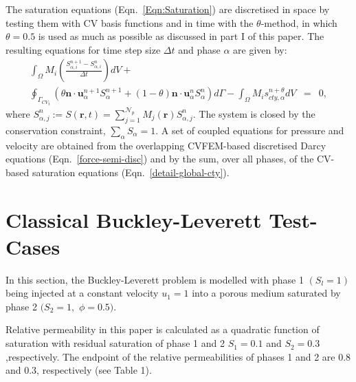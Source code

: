 \documentclass[preprint,authoryear,12pt]{elsarticle}
\begin{document}
The saturation equations (Eqn.~\ref{Eqn:Saturation}) are discretised
in space by testing them with CV basis functions and in
time with the $\theta$-method, in which $\theta=0.5$ is used as much
as possible as discussed in part I of this paper. The resulting
equations for time step size $\Delta t$ and phase $\alpha$ are given
by:
\begin{eqnarray}
  \displaystyle \int_{\Omega} M_{i}
  \left(\frac{S_{\alpha,i}^{n+1}-S_{\alpha,i}^{n}}{\Delta t}\right) dV +  \nonumber \\
  \displaystyle \oint_{ {\Gamma_{CV}}_{i}} \left ( \theta \mathbf{n}
  \cdot \mathbf{u}_{\alpha}^{n+1} S_{\alpha}^{n+1} + (1-\theta)
  \mathbf{n} \cdot \mathbf{u}_{\alpha}^{n} S_{\alpha}^{n} \right)
  d\Gamma -\displaystyle \int_{\Omega} M_{i}
  s_{cty,\alpha}^{n+\theta} dV &=& 0,
  \label{detail-global-cty}
\end{eqnarray}
where $S^{n}_{\alpha,j}:=S(\bm{r},t)=
\sum_{j=1}^{\mathcal{N}_p} M_j(\bm{r}) S^n_{\alpha,j}$. The system is
closed by the conservation constraint, $\sum_\alpha S_\alpha=1$.  A
set of coupled equations for pressure and velocity are obtained from
the overlapping CVFEM-based discretised Darcy equations
(Eqn.~\ref{force-semi-disc}) and by the sum, over all phases, of the CV-based
saturation equations (Eqn.~\ref{detail-global-cty}).


\section{Classical Buckley-Leverett Test-Cases}\label{classical_BL}

In this section, the Buckley-Leverett \citep{buckley1942} 
problem is modelled with phase 1 $\left(S_{l}=1\right)$ being injected 
at a constant velocity $u_{1}=1$ into a porous medium saturated by 
phase 2 $(S_{2}=1,$ $\phi=0.5)$.  

Relative permeability in this paper is calculated as a quadratic 
function of saturation with residual saturation of phase 1 and 2  $S_{1}=0.1$ 
and $S_{2}=0.3$ ,respectively.  The endpoint of the relative permeabilities
 of phases 1 and 2 are 0.8 and 0.3, respectively (see Table 1).
\end{document}
